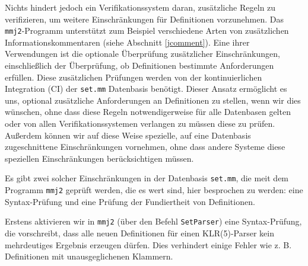Nichts hindert jedoch ein Verifikationssystem daran, zusätzliche Regeln zu verifizieren, um weitere Einschränkungen für Definitionen vorzunehmen. Das \texttt{mmj2}-Programm unterstützt zum Beispiel verschiedene Arten von zusätzlichen Informationskommentaren (siehe Abschnitt \ref{jcomment}). Eine ihrer Verwendungen ist die optionale Überprüfung zusätzlicher Einschränkungen, einschließlich der Überprüfung, ob Definitionen bestimmte Anforderungen erfüllen. Diese zusätzlichen Prüfungen werden von der kontinuierlichen Integration (CI) der \texttt{set.mm} Datenbasis benötigt. Dieser Ansatz ermöglicht es uns, optional zusätzliche Anforderungen an Definitionen zu stellen, wenn wir dies wünschen, ohne dass diese Regeln notwendigerweise für alle Datenbasen gelten oder von allen Verifikationssystemen verlangen zu müssen diese zu prüfen. Außerdem können wir auf diese Weise spezielle, auf eine Datenbasis zugeschnittene Einschränkungen vornehmen, ohne dass andere Systeme diese speziellen Einschränkungen berücksichtigen müssen.

Es gibt zwei solcher Einschränkungen in der Datenbasis \texttt{set.mm}, die meit dem Programm \texttt{mmj2} geprüft werden, die es wert sind, hier besprochen zu werden: eine Syntax-Prüfung und eine Prüfung der Fundiertheit von Definitionen.

%

Erstens aktivieren wir in \texttt{mmj2} (über den Befehl \texttt{SetParser}) eine Syntax-Prüfung, die vorschreibt, dass alle neuen Definitionen für einen KLR(5)-Parser kein mehrdeutiges Ergebnis erzeugen dürfen. Dies verhindert einige Fehler wie z. B. Definitionen mit unausgeglichenen Klammern.

